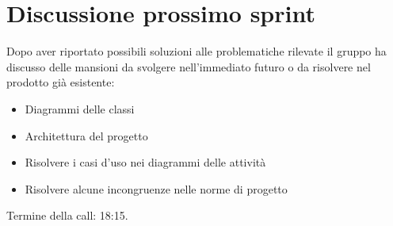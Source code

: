 \section{Discussione prossimo sprint}
\noindent Dopo aver riportato possibili soluzioni alle problematiche rilevate il gruppo ha
discusso delle mansioni da svolgere nell'immediato futuro o da risolvere nel prodotto già esistente:
\begin{itemize}
	\item Diagrammi delle classi
	\item Architettura del progetto
	\item Risolvere i casi d'uso nei diagrammi delle attività
	\item Risolvere alcune incongruenze nelle norme di progetto
\end{itemize}
\noindent Termine della call: 18:15.